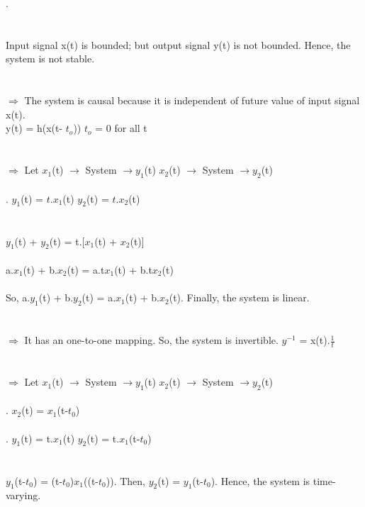 \documentclass[10pt,a4paper, margin=1in]{article}
\begin{document}
\begin{enumerate}
\begin{enumerate}
    .\\\\\\
    Input signal x(t) is bounded; but output signal y(t) is not bounded. Hence, the system is not stable.\\\\\\
    $\Rightarrow$ The system is causal because it is independent of future value of input signal x(t).\\ y(t) = h(x(t- $t_{o}$)) $t_{o}$ = 0 for all t\\\\\\
    $\Rightarrow$ Let $x_{1}$(t) $\rightarrow$  System $\rightarrow y_{1}$(t) \hspace{5cm} $x_{2}$(t) $\rightarrow$  System $\rightarrow y_{2}$(t)\\\\
    .\hspace{0.7cm} $y_{1}$(t) = $t.x_{1}$(t) \hspace{6.7cm} $y_{2}$(t) = $t.x_{2}$(t)\\\\\\
    $y_{1}$(t) + $y_{2}$(t) = t.[$x_{1}$(t) + $x_{2}$(t)]\\\\
    a.$x_{1}$(t) + b.$x_{2}$(t) = a.t$x_{1}$(t) + b.t$x_{2}$(t)\\\\
    So, a.$y_{1}$(t) + b.$y_{2}$(t) = a.$x_{1}$(t) + b.$x_{2}$(t). Finally, the system is linear.\\\\\\
    $\Rightarrow$ It has an one-to-one mapping. So, the system is invertible. \hspace{2cm} $y^{-1}$ = x(t).$\frac{1}{t}$\\\\\\
    $\Rightarrow$ Let $x_{1}$(t) $\rightarrow$  System $\rightarrow y_{1}$(t) \hspace{5cm} $x_{2}$(t) $\rightarrow$  System $\rightarrow y_{2}$(t)\\\\
    .\hspace{10.3cm} $x_{2}$(t) = $x_{1}$(t-$t_{0}$)\\\\
    .\hspace{0.7cm} $y_{1}$(t) = t.$x_{1}$(t) \hspace{6.7cm} $y_{2}$(t) = t.$x_{1}$(t-$t_{0}$)\\\\\\
    $y_{1}$(t-$t_{0}$) = (t-$t_{0}$)$x_{1}$((t-$t_{0}$)). Then, $y_{2}$(t) =  $y_{1}$(t-$t_{0}$). Hence, the system is time-varying.\\\\
    

\end{enumerate}
\end{enumerate}
\end{document}
